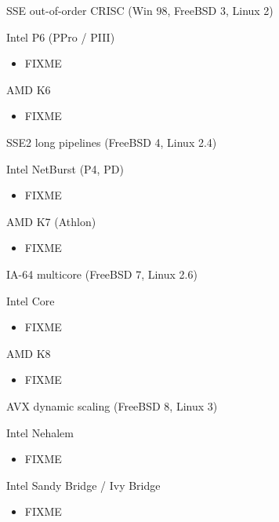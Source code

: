\documentclass[xcolor={dvipsnames,table}]{beamer}
\begin{document}
\begin{frame}[t]{SSE out-of-order CRISC (Win 98, FreeBSD 3, Linux 2)}

\begin{block}{Intel P6 (PPro / PIII)}
\begin{itemize}
\item FIXME
\end{itemize}
\end{block}
\begin{block}{AMD K6}
\begin{itemize}
\item FIXME
\end{itemize}
\end{block}
\vfill
\end{frame}

\begin{frame}[t]{SSE2 long pipelines (FreeBSD 4, Linux 2.4)}
\begin{block}{Intel NetBurst (P4, PD)}
\begin{itemize}
\item FIXME
\end{itemize}
\end{block}
\begin{block}{AMD K7 (Athlon)}
\begin{itemize}
\item FIXME
\end{itemize}
\end{block}
\vfill
\end{frame}

\begin{frame}[t]{IA-64 multicore (FreeBSD 7, Linux 2.6)}
\begin{block}{Intel Core}
\begin{itemize}
\item FIXME
\end{itemize}
\end{block}
\begin{block}{AMD K8}
\begin{itemize}
\item FIXME
\end{itemize}
\end{block}
\vfill
\end{frame}

\begin{frame}[t]{AVX dynamic scaling (FreeBSD 8, Linux 3)}
\begin{block}{Intel Nehalem}
\begin{itemize}
\item FIXME
\end{itemize}
\end{block}
\begin{block}{Intel Sandy Bridge / Ivy Bridge}
\begin{itemize}
\item FIXME
\end{itemize}
\end{block}
\vfill
\end{frame}
\end{document}
